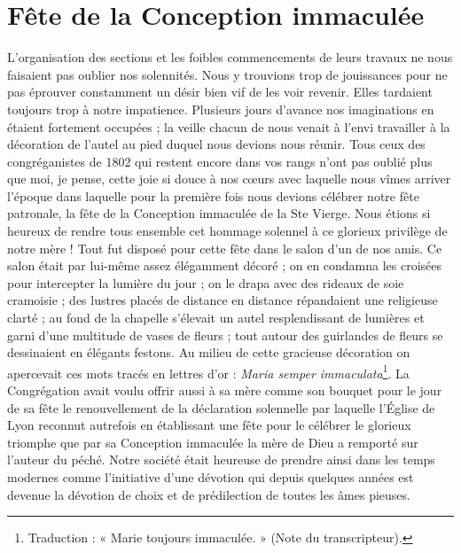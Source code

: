 \section*{Fête de la Conception immaculée}
L'organisation des sections et les foibles commencements de leurs travaux ne nous faisaient pas oublier nos solennités. Nous y trouvions trop de jouissances pour ne pas éprouver constamment un désir bien vif de les voir revenir. Elles tardaient toujours trop à notre impatience. Plusieurs jours d'avance nos imaginations en étaient fortement occupées ; la veille chacun de nous venait à l'envi travailler à la décoration de l'autel au pied duquel nous devions nous réunir. Tous ceux des congréganistes de 1802 qui restent encore dans vos rangs n'ont pas oublié plus que moi, je pense, cette joie si douce à nos cœurs avec laquelle nous vîmes arriver l'époque dans laquelle pour la première fois nous devions célébrer notre fête patronale, la fête de la Conception immaculée de la Ste Vierge. Nous étions si heureux de rendre tous ensemble cet hommage solennel à ce glorieux privilège de notre mère ! Tout fut disposé pour cette fête dans le salon d'un de nos amis. Ce salon était par lui-même assez élégamment décoré ; on en condamna les croisées pour intercepter la lumière du jour ; on le drapa avec des rideaux de soie cramoisie ; des lustres placés de distance en distance répandaient une religieuse clarté ; au fond de la chapelle s'élevait un autel resplendissant de lumières et garni
d'une multitude de vases de fleurs ; tout autour des guirlandes de fleurs se dessinaient en élégants festons. Au milieu de cette gracieuse décoration on apercevait ces mots tracés en lettres d'or : \textit{Maria semper immaculata}\footnote{Traduction : « Marie toujours immaculée. » (Note du transcripteur).}. La Congrégation avait voulu offrir aussi à sa mère comme son bouquet pour le jour de sa fête le renouvellement de la déclaration solennelle par laquelle l'Église de Lyon reconnut autrefois en établissant une fête pour le célébrer le glorieux triomphe que par sa Conception immaculée la mère de Dieu a remporté sur l'auteur du péché. Notre société était heureuse de prendre ainsi dans les temps modernes comme l'initiative d'une dévotion qui depuis quelques années est devenue la dévotion de choix et de prédilection de toutes les âmes pieuses.

